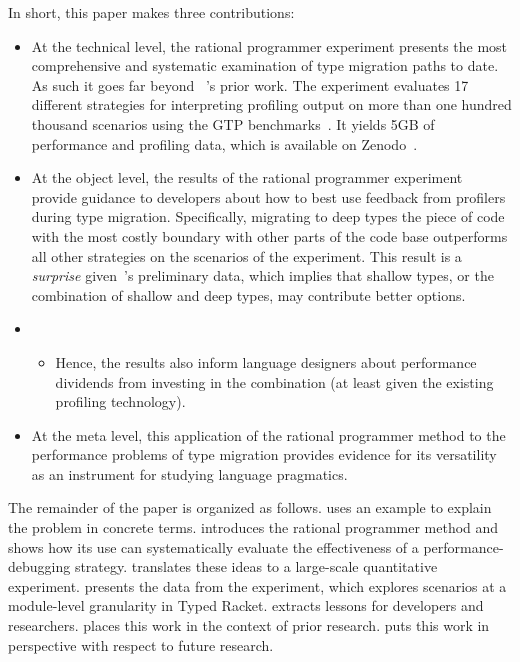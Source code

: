 In short, this paper makes three contributions:
\begin{itemize}

\item At the technical level, the rational programmer experiment presents
  the most comprehensive and systematic examination of type migration
    paths to date.    As such it goes far beyond ~\citet{g-deep-shallow}'s 
    prior work.  The experiment evaluates 17 different strategies for
    interpreting profiling output on  more than one hundred thousand scenarios using the GTP
    benchmarks~\cite{g-rep-2023}. It yields
     5GB of performance and profiling data, which
    is available on
    Zenodo~\cite{gdf-artifact-2023}.
  
\item At the object level, the results of the rational programmer
  experiment provide guidance to developers about how to best use feedback
    from profilers during type migration. Specifically, 
    migrating to deep types the piece of code with the most costly
    boundary with other parts of the code base
    outperforms all other  strategies on the scenarios of
    the experiment. This result is a \emph{surprise} given~\citet{g-deep-shallow}'s
    preliminary data, which implies that shallow types, or the combination of shallow and deep
    types, may contribute better options.

     \item[]\begin{itemize}
      \item
         Hence, the results also inform language designers about
         performance dividends from investing in  the combination 
         (at least given the existing profiling technology).
    \end{itemize}


\item At the meta level, this application of the rational programmer method to
 the performance problems of type migration provides evidence for its versatility
 as an instrument for studying language pragmatics.

\end{itemize}
The remainder of the paper is organized as follows.  
uses an example to explain the problem in concrete terms. 
introduces the rational programmer method and shows how its use can systematically
evaluate the effectiveness of a performance-debugging strategy.
 translates these ideas to a
large-scale quantitative experiment.
 presents the data from the experiment, which
explores scenarios at a module-level granularity in Typed Racket.
 extracts lessons for developers and researchers.
 places this work in the context of prior research.
 puts this work in perspective with respect to future
research.
